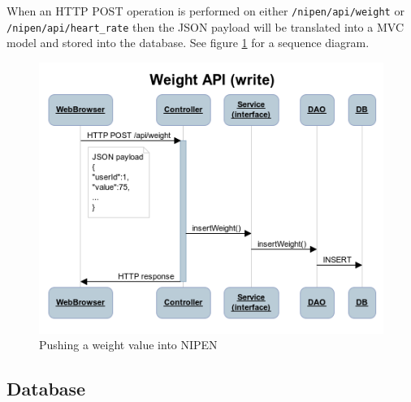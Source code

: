 When an HTTP POST operation is performed on either \verb|/nipen/api/weight| or \newline
\verb|/nipen/api/heart_rate| then the JSON payload will be translated into a MVC model and
stored into the database. See figure \ref{figure:seqw} for a sequence diagram.

\begin{figure}[h]
\centering
\includegraphics[scale=0.8]{../Figures/seqw.png}
\caption{Pushing a weight value into NIPEN}
\label{figure:seqw}
\end{figure}


\subsection{Database}

